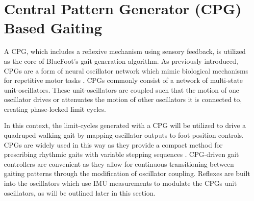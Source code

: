 	\section{Central Pattern Generator (CPG) Based Gaiting}
		\label{sec::cpg_gait_control}
		A CPG, which includes a reflexive mechanism using sensory feedback, is utilized as the core of BlueFoot's gait generation algorithm. As previously introduced, CPGs are a form of neural oscillator network which mimic biological mechanisms for repetitive motor tasks \cite{Ijspeert2008,Collins1993}. CPGs commonly consist of a network of multi-state unit-oscillators. These unit-oscillators are coupled such that the motion of one oscillator drives or attenuates the motion of other oscillators it is connected to, creating phase-locked limit cycles.

		In this context, the limit-cycles generated with a CPG will be utilized to drive a quadruped  walking gait by mapping oscillator outputs to foot position controls. CPGs are widely used in this way as they provide a compact method for prescribing rhythmic gaits with variable stepping sequences \cite{Righetti2006,Castro2008,Li2014}. CPG-driven gait controllers are convenient as they allow for continuous transitioning between gaiting patterns through the modification of oscillator coupling. Reflexes are built into the oscillators which use IMU measurements to modulate the CPGs unit oscillators, as will be outlined later in this section.

